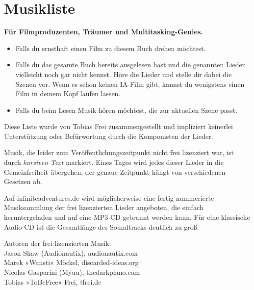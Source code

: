 \chapter{Musikliste}

\textbf{Für Filmproduzenten, Träumer und Multitasking-Genies.}

\begin{itemize}
    \item Falls du ernsthaft einen Film zu diesem Buch drehen möchtest.
    \item Falls du das gesamte Buch bereits ausgelesen hast und die genannten Lieder vielleicht noch gar nicht kennst. Höre die Lieder und stelle dir dabei die Szenen vor. Wenn es schon keinen IA-Film gibt, kannst du wenigstens einen Film in deinem Kopf laufen lassen.
    \item Falls du beim Lesen Musik hören möchtest, die zur aktuellen Szene passt.
\end{itemize}

Diese Liste wurde von Tobias Frei zusammengestellt und impliziert keinerlei Unterstützung oder Befürwortung durch die Komponisten der Lieder.

Musik, die leider zum Veröffentlichungszeitpunkt nicht frei lizenziert war, ist durch \textit{kursiven Text} markiert. Eines Tages wird jedes dieser Lieder in die Gemeinfreiheit übergehen; der genaue Zeitpunkt hängt von verschiedenen Gesetzen ab.

Auf infiniteadventures.de wird möglicherweise eine fertig nummerierte Musiksammlung der frei lizenzierten Lieder angeboten, die einfach heruntergeladen und auf eine MP3-CD gebrannt werden kann. Für eine klassische Audio-CD ist die Gesamtlänge des Soundtracks deutlich zu groß.

Autoren der frei lizenzierten Musik:\\
Jason Shaw (Audionautix), audionautix.com\\
Marek »Wansti« Möckel, discarded-ideas.org\\
Nicolas Gasparini (Myuu), thedarkpiano.com\\ %
Tobias »ToBeFree« Frei, tfrei.de

